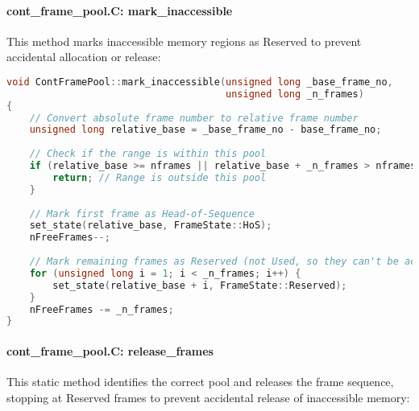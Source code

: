 \documentclass{article}
\begin{document}
\paragraph{cont\_frame\_pool.C: mark\_inaccessible} This method marks inaccessible memory regions as Reserved to prevent accidental allocation or release:

\begin{lstlisting}[language=C++, caption=Mark Inaccessible Method]
void ContFramePool::mark_inaccessible(unsigned long _base_frame_no,
                                      unsigned long _n_frames)
{
    // Convert absolute frame number to relative frame number
    unsigned long relative_base = _base_frame_no - base_frame_no;
    
    // Check if the range is within this pool
    if (relative_base >= nframes || relative_base + _n_frames > nframes) {
        return; // Range is outside this pool
    }
    
    // Mark first frame as Head-of-Sequence
    set_state(relative_base, FrameState::HoS);
    nFreeFrames--;
    
    // Mark remaining frames as Reserved (not Used, so they can't be accidentally released)
    for (unsigned long i = 1; i < _n_frames; i++) {
        set_state(relative_base + i, FrameState::Reserved);
    }
    nFreeFrames -= _n_frames;
}
\end{lstlisting}

\paragraph{cont\_frame\_pool.C: release\_frames} This static method identifies the correct pool and releases the frame sequence, stopping at Reserved frames to prevent accidental release of inaccessible memory:
\end{document}
